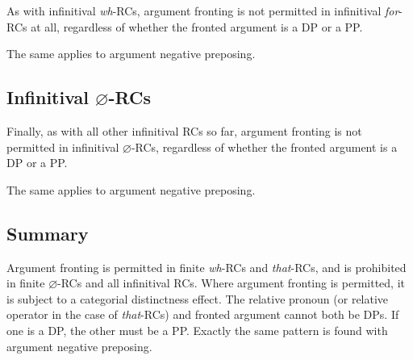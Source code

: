 \documentclass[output=paper]{langsci/langscibook}
\begin{document}
As with infinitival \emph{wh}{-RCs, a}rgument fronting is not permitted in infinitival \emph{for}{-\glspl{RC} at all, regardless of whether the} fronted argument is a DP or a PP\@.

\ea\label{ex:key:2.67}
    \z
\z
\ea\label{ex:key:2.68}
    \z
\z
The same applies to argument negative preposing.

\ea\label{ex:key:2.69}
    \z
\z
\ea\label{ex:key:2.70}
    \z
\z

\subsection{Infinitival $\varnothing$-RCs}

Finally, as with all other infinitival \glspl{RC} so far, argument fronting is not
permitted in infinitival $\varnothing${-RCs, regardless of whether the} fronted
argument is a DP or a PP\@.

\label{ex:key:2.71}
\z
{}\label{ex:key:2.72}
\z
The same applies to argument negative preposing.

\label{ex:key:2.73}
\z
{}\label{ex:key:2.74}
\z

\subsection{Summary}

Argument fronting is permitted in finite \emph{wh}-\glspl{RC} and \emph{that}-RCs, and
is prohibited in finite $\varnothing$-\glspl{RC} and all infinitival \glspl{RC}. Where
argument fronting is permitted, it is subject to a categorial distinctness
effect. The relative pronoun (or relative operator in the case of
\emph{that}-\glspl{RC}) and fronted argument cannot both be DPs. If one is a
DP, the other must be a PP\@.  Exactly the same pattern is found with argument
negative preposing.
\end{document}
